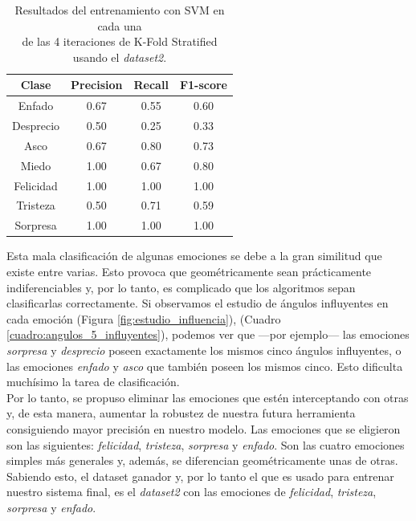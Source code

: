 \begin{table}[h!]
\begin{minipage}{0.48\linewidth}
\begin{adjustbox}{max width=\textwidth}
\begin{tabular}{|c|c|c|c|}
\hline
\textbf{Clase} & \textbf{Precision} & \textbf{Recall} & \textbf{F1-score}\\
\hline
     Enfado & 0.67 & 0.55 & 0.60\\
     Desprecio & 0.50 & 0.25 & 0.33\\
     Asco & 0.67 & 0.80 & 0.73\\
     Miedo & 1.00 & 0.67 & 0.80\\
     Felicidad & 1.00 & 1.00 & 1.00\\
     Tristeza & 0.50 & 0.71 & 0.59\\
     Sorpresa & 1.00 & 1.00 & 1.00\\
\hline
\end{tabular}
\end{adjustbox}
\end{minipage}
\captionsetup{justification=centering}
\caption{Resultados del entrenamiento con SVM en cada una\\
de las 4 iteraciones de K-Fold Stratified usando el \textit{dataset2}.}
\label{cuadro:resultados_SVM}
\end{table}

Esta mala clasificación de algunas emociones se debe a la gran similitud que existe entre varias. Esto provoca que geométricamente sean prácticamente indiferenciables y, por lo tanto, es complicado que los algoritmos sepan clasificarlas correctamente. Si observamos el estudio de ángulos influyentes en cada emoción (Figura \ref{fig:estudio_influencia}), (Cuadro \ref{cuadro:angulos_5_influyentes}), podemos ver que ---por ejemplo--- las emociones \textit{sorpresa} y \textit{desprecio} poseen exactamente los mismos cinco ángulos influyentes, o las emociones \textit{enfado} y \textit{asco} que también poseen los mismos cinco. Esto dificulta muchísimo la tarea de clasificación.\\

Por lo tanto, se propuso eliminar las emociones que estén interceptando con otras y, de esta manera, aumentar la robustez de nuestra futura herramienta consiguiendo mayor precisión en nuestro modelo. Las emociones que se eligieron son las siguientes: \textit{felicidad}, \textit{tristeza}, \textit{sorpresa} y \textit{enfado}. Son las cuatro emociones simples más generales y, además, se diferencian geométricamente unas de otras. Sabiendo esto, el dataset ganador y, por lo tanto el que es usado para entrenar nuestro sistema final, es el \textit{dataset2} con las emociones de \textit{felicidad}, \textit{tristeza}, \textit{sorpresa} y \textit{enfado}.

